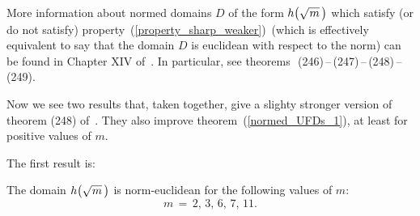 More information about normed domains $D$ of the form
$\hh{m}$ which satisfy (or do not satisfy)
property~(\ref{property_sharp_weaker})\, (which is
effectively equivalent to say that the domain $D$ is
euclidean with respect to the norm) can be found in
Chapter XIV of~\cite{H&W}. In particular, see
\mbox{theorems\, (246)\,--\,(247)\,--\,(248)\,--\,(249).}

%
\bigskip
Now we see two results that, taken together, give a
slighty stronger version of theorem (248) of~\cite{H&W}.
They also improve theorem~(\ref{normed_UFDs_1}), at
least for positive values of $m$.

\medskip
The first result is:

\begin{thm}\label{normed_UFDs_2}
The domain $\hh{m}$ is norm-euclidean for the following values of $m$:
$$ m\, =\, 2,\, 3,\, 6,\, 7,\, 11. $$
\end{thm}

